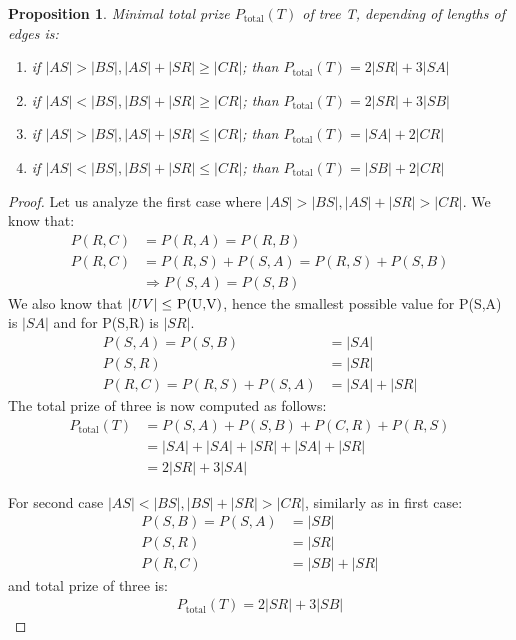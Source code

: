 \documentclass[12pt]{article}
\newcommand{\Price}[2]{P(#1,#2)}
\newcommand{\Ptotal}[1]{P_{\text{total}}(#1)}
\newtheorem{proposition}{Proposition}
\newtheorem{proof}{Proof}
\begin{document}
	\begin{proposition}\label{prop:tp} 
		 Minimal total prize \(\Ptotal{T}\) of tree T, depending of lengths of edges is:
		\begin{enumerate}
		\item if \( |AS| > |BS|, |AS|+|SR| \geq |CR| \); than \(\Ptotal{T} = 2 |SR| + 3 |SA|\)
		\item if \( |AS| < |BS|, |BS|+|SR| \geq |CR| \); than \(\Ptotal{T} = 2 |SR| + 3 |SB|\)
		\item if \( |AS| > |BS|, |AS|+|SR| \leq |CR| \); than \(\Ptotal{T} = |SA| + 2 |CR|\)
		\item if \( |AS| < |BS|, |BS|+|SR| \leq |CR| \); than \(\Ptotal{T} = |SB| + 2 |CR|\)
		\end{enumerate}
	\end{proposition}
	\begin{proof}
	Let us analyze the first case where \( |AS| > |BS|, |AS|+|SR| > |CR| \).
	We know that:
	\begin{align*}
	\Price{R}{C} &= \Price{R}{A} = \Price{R}{B} \\
	\Price{R}{C} &= \Price{R}{S} + \Price{S}{A} = \Price{R}{S} + \Price{S}{B} \\
	&\Rightarrow \Price{S}{A} = \Price{S}{B}
	\end{align*}
	We also know that \( |UV| \leq  $ \Price{U}{V}$ \), hence the smallest possible value for \Price{S}{A} is \(|SA|\) and for \Price{S}{R} is \(|SR|\).
	\begin{align*}	
		\Price{S}{A} = \Price{S}{B} &= |SA| \\
		\Price{S}{R} &= |SR| \\
		\Price{R}{C} = \Price{R}{S} + \Price{S}{A} &= |SA| + |SR|
	\end{align*}
	The total prize of three is now computed as follows:
	\begin{align*}	
		\Ptotal{T} &= \Price{S}{A} + \Price{S}{B} + \Price{C}{R} + \Price{R}{S} \\
		&= |SA| + |SA| + |SR| + |SA| + |SR| \\
		&= 2 |SR| + 3 |SA|
	\end{align*}
	
	
	For second case \( |AS| < |BS|, |BS|+|SR| > |CR| \), similarly as in first case:
	\begin{align*}
		\Price{S}{B} = \Price{S}{A} &= |SB| \\
		\Price{S}{R} &= |SR| \\
		\Price{R}{C} &= |SB| + |SR|
	\end{align*}
		and total prize of three is:
	\begin{align*}	
		\Ptotal{T} = 2 |SR| + 3 |SB|
	\end{align*}
	

\end{proof}
\end{document}

